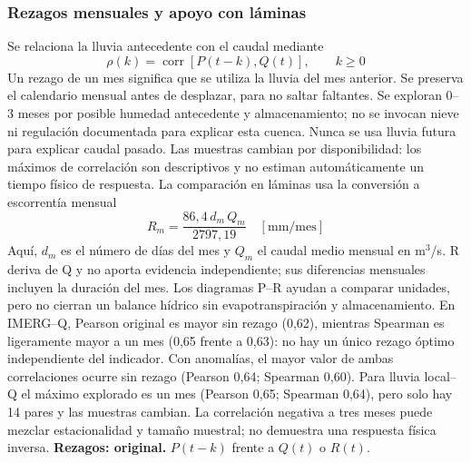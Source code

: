\documentclass[10pt,a4paper]{article}
\begin{document}
\subsubsection*{Rezagos mensuales y apoyo con láminas}
Se relaciona la lluvia antecedente con el caudal mediante
\begin{equation}
\rho(k)=\operatorname{corr}\!\left[P(t-k),Q(t)\right],\qquad k\geq 0
\end{equation}
Un rezago de un mes significa que se utiliza la lluvia del mes anterior. Se preserva el calendario mensual antes de desplazar, para no saltar faltantes. Se exploran 0--3 meses por posible humedad antecedente y almacenamiento; no se invocan nieve ni regulación documentada para explicar esta cuenca. Nunca se usa lluvia futura para explicar caudal pasado. Las muestras cambian por disponibilidad: los máximos de correlación son descriptivos y no estiman automáticamente un tiempo físico de respuesta. La comparación en láminas usa la conversión a escorrentía mensual
\begin{equation}
R_m=\frac{86{,}4\,d_m\,Q_m}{2797{,}19}\quad[\mathrm{mm/mes}]
\end{equation}
Aquí, $d_m$ es el número de días del mes y $Q_m$ el caudal medio mensual en m$^3$/s. R deriva de Q y no aporta evidencia independiente; sus diferencias mensuales incluyen la duración del mes. Los diagramas P--R ayudan a comparar unidades, pero no cierran un balance hídrico sin evapotranspiración y almacenamiento. En IMERG--Q, Pearson original es mayor sin rezago (0,62), mientras Spearman es ligeramente mayor a un mes (0,65 frente a 0,63): no hay un único rezago óptimo independiente del indicador. Con anomalías, el mayor valor de ambas correlaciones ocurre sin rezago (Pearson 0,64; Spearman 0,60). Para lluvia local--Q el máximo explorado es un mes (Pearson 0,65; Spearman 0,64), pero solo hay 14 pares y las muestras cambian. La correlación negativa a tres meses puede mezclar estacionalidad y tamaño muestral; no demuestra una respuesta física inversa.
\textbf{Rezagos: original.} $P(t-k)$ frente a $Q(t)$ o $R(t)$.
\end{document}
